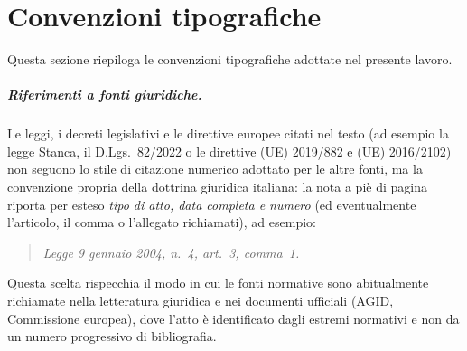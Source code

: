\cleardoublepage
{}
{}

\begingroup
\let\clearpage\relax
\let\cleardoublepage\relax

\chapter*{Convenzioni tipografiche}

Questa sezione riepiloga le convenzioni tipografiche adottate nel presente lavoro.

\paragraph*{Riferimenti a fonti giuridiche.} Le leggi, i decreti legislativi e le direttive europee citati nel testo (ad esempio la legge Stanca, il D.Lgs.~82/2022 o le direttive (UE) 2019/882 e (UE) 2016/2102) non seguono lo stile di citazione numerico adottato per le altre fonti, ma la convenzione propria della dottrina giuridica italiana: la nota a piè di pagina riporta per esteso \emph{tipo di atto, data completa e numero} (ed eventualmente l'articolo, il comma o l'allegato richiamati), ad esempio:
\begin{quote}
\itshape Legge 9 gennaio 2004, n.~4, art.~3, comma~1.
\end{quote}
Questa scelta rispecchia il modo in cui le fonti normative sono abitualmente richiamate nella letteratura giuridica e nei documenti ufficiali (AGID, Commissione europea), dove l'atto è identificato dagli estremi normativi e non da un numero progressivo di bibliografia.

